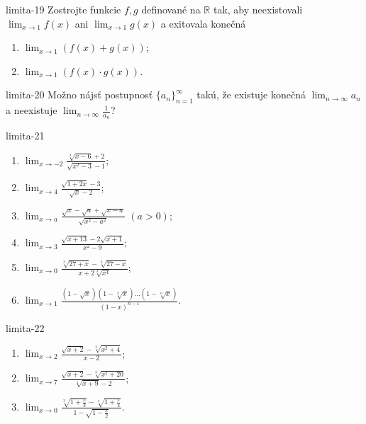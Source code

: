 \begin{defproblem}{limita-19}
Zostrojte funkcie $f,g$ definované na $\mathbb{R}$ tak, aby neexistovali $\lim_{x \rightarrow 1} f(x)$ ani $\lim_{x \rightarrow 1} g(x)$ a exitovala konečná 
\begin{multicols}{2}
\begin{enumerate}
    \item $\lim_{{x \rightarrow 1}} (f(x)+g(x))$;
    \item $\lim_{{x \rightarrow 1}} (f(x) \cdot g(x))$.
\end{enumerate}
\end{multicols}
\end{defproblem}

\begin{defproblem}{limita-20}
Možno nájsť postupnosť ${\{a_n\}}_{n=1}^\infty$ takú, že existuje konečná $\lim_{n \rightarrow \infty} a_n$ a neexistuje $\lim_{n \rightarrow \infty} \frac{1}{a_n}$?
\end{defproblem}

\begin{defproblem}{limita-21}
\begin{multicols}{2}
\begin{enumerate}
    \item $\lim_{{x \rightarrow -2}} \frac{\sqrt[3]{x-6}+2}{\sqrt{x^2-3}-1}$;
    \item $\lim_{{x \rightarrow 4}} \frac{\sqrt{1+2x}-3}{\sqrt{x}-2}$;
    \item $\lim_{{x \rightarrow a}} \frac{\sqrt{x}-\sqrt{a}+\sqrt{x-a}}{\sqrt{x^2-a^2}}$ $(a>0)$;
    \item $\lim_{{x \rightarrow 3}} \frac{\sqrt{x+13}-2\sqrt{x+1}}{x^2-9}$;
    \item $\lim_{{x \rightarrow 0}} \frac{\sqrt[3]{27+x}-\sqrt[3]{27-x}}{x+2\sqrt[3]{x^4}}$;
    \item $\lim_{{x \rightarrow 1}} \frac{(1-\sqrt{x})(1-\sqrt[3]{x})...(1-\sqrt[n]{x})}{(1-x)^{n-1}}$.
\end{enumerate}
\end{multicols}
\end{defproblem}

\begin{defproblem}{limita-22}
\begin{enumerate}
\item $\lim_{x \rightarrow 2} \frac{\sqrt{x+2}-\sqrt[3]{x^2+4}}{x-2}$;
\item  $\lim_{x \rightarrow 7} \frac{\sqrt{x+2}-\sqrt[3]{x^2+20}}{\sqrt[4]{x+9}-2}$;
\item  $\lim_{x \rightarrow 0} \frac{\sqrt[3]{1+\frac{x}{3}}-\sqrt[4]{1+\frac{x}{4}}}{1-\sqrt{1-\frac{x}{2}}}$.
\end{enumerate}
\end{defproblem}

